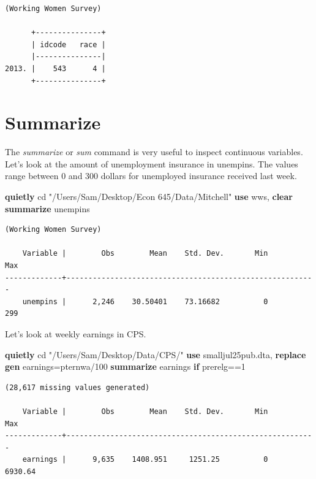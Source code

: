 \documentclass[
]{book}
\newenvironment{Shaded}{\begin{snugshade}}{\end{snugshade}}
\newcommand{\KeywordTok}[1]{\textcolor[rgb]{0.13,0.29,0.53}{\textbf{#1}}}
\newcommand{\NormalTok}[1]{#1}
\newcommand{\StringTok}[1]{\textcolor[rgb]{0.31,0.60,0.02}{#1}}
\begin{document}
\begin{verbatim}
(Working Women Survey)

      +---------------+
      | idcode   race |
      |---------------|
2013. |    543      4 |
      +---------------+
\end{verbatim}

\section{Summarize}\label{summarize}

The \emph{summarize} or \emph{sum} command is very useful to inspect continuous variables. Let's look at the amount of unemployment insurance in unempins. The values range between 0 and 300 dollars for unemployed insurance received last week.

\begin{Shaded}
\begin{Highlighting}[]
\KeywordTok{quietly}\NormalTok{ cd }\StringTok{"/Users/Sam/Desktop/Econ 645/Data/Mitchell"}
\KeywordTok{use}\NormalTok{ wws, }\KeywordTok{clear}
\KeywordTok{summarize}\NormalTok{ unempins}
\end{Highlighting}
\end{Shaded}

\begin{verbatim}
(Working Women Survey)

    Variable |        Obs        Mean    Std. Dev.       Min        Max
-------------+---------------------------------------------------------
    unempins |      2,246    30.50401    73.16682          0        299
\end{verbatim}

Let's look at weekly earnings in CPS.

\begin{Shaded}
\begin{Highlighting}[]
\KeywordTok{quietly}\NormalTok{ cd }\StringTok{"/Users/Sam/Desktop/Data/CPS/"}
\KeywordTok{use}\NormalTok{ smalljul25pub.dta, }\KeywordTok{replace}
\KeywordTok{gen}\NormalTok{ earnings=pternwa/100}
\KeywordTok{summarize}\NormalTok{ earnings }\KeywordTok{if}\NormalTok{ prerelg==1}
\end{Highlighting}
\end{Shaded}

\begin{verbatim}
(28,617 missing values generated)

    Variable |        Obs        Mean    Std. Dev.       Min        Max
-------------+---------------------------------------------------------
    earnings |      9,635    1408.951     1251.25          0    6930.64
\end{verbatim}
\end{document}

